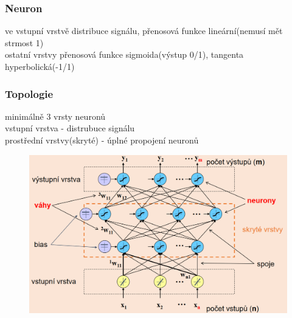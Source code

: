 \subsubsection*{Neuron}
ve vstupní vrstvě distribuce signálu, přenosová funkce lineární(nemusí mět strmost 1)\\
ostatní vrstvy přenosová funkce sigmoida(výstup 0/1), tangenta hyperbolická(-1/1)

\subsubsection*{Topologie}
minimálně 3 vrsty neuronů\\
vstupní vrstva - distrubuce signálu\\
prostřední vrstvy(skryté) - úplné propojení neuronů\\
\begin{figure}[H]
    \includegraphics[scale = 0.3]{images/backPropag_topologie.png}
\end{figure}

